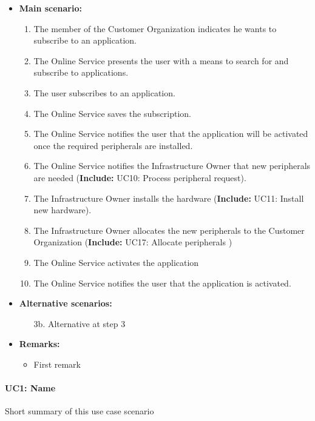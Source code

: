 \documentclass[english,peerreview]{sareport}
\begin{document}
\begin{itemize}
    \item \textbf{Main scenario:} 
    \begin{enumerate}
       \item The member of the Customer Organization indicates he wants to subscribe to an application.
       \item The Online Service presents the user with a means to search for and subscribe to applications.
       \item The user subscribes to an application.
	\item The Online Service saves the subscription.
	\item The Online Service notifies the user that the application will be activated once the required peripherals are installed.
	\item The Online Service notifies the Infrastructure Owner that new peripherals are needed (\textbf{Include:} UC10: Process peripheral request).
	\item The Infrastructure Owner installs the hardware (\textbf{Include:} UC11: Install new hardware).
    \item The Infrastructure Owner allocates the new peripherals to the Customer Organization (\textbf{Include:} UC17: Allocate peripherals )
	\item The Online Service activates the application
	\item The Online Service notifies the user that the application is activated.
    \end{enumerate}

    \item \textbf{Alternative scenarios:} 
    \begin{enumerate}
        \item [3b.] Alternative at step 3
    \end{enumerate}
    
    \item \textbf{Remarks:}
        \begin{itemize}
            \item First remark
        \end{itemize}
\end{itemize}

\paragraph{UC1: Name}
Short summary of this use case scenario
\end{document}
